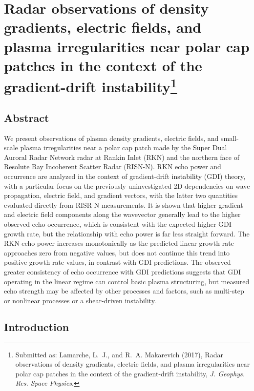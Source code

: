 \chapter[Radar observations of density gradients, electric fields, and plasma irregularities near polar cap patches in the context of the gradient-drift instability]{Radar observations of density gradients, electric fields, and plasma irregularities near polar cap patches in the context of the gradient-drift instability\footnote{Submitted as: {Lamarche}, L.~J., and R.~A. {Makarevich} (2017), Radar observations of density gradients, electric fields, and plasma irregularities near polar cap patches in the context of the gradient-drift instability, \textit{J. Geophys. Res. Space Physics}.}}

\label{sec:paper3}



\section*{Abstract}
We present observations of plasma density gradients, electric fields, and small-scale plasma irregularities near a polar cap patch made by the Super Dual Auroral Radar Network radar at Rankin Inlet (RKN) and the northern face of Resolute Bay Incoherent Scatter Radar (RISN-N). RKN echo power and occurrence are analyzed in the context of gradient-drift instability (GDI) theory, with a particular focus on the previously uninvestigated 2D dependencies on wave propagation, electric field, and gradient vectors, with the latter two quantities evaluated directly from RISR-N measurements. It is shown that higher gradient and electric field components along the wavevector generally lead to the higher observed echo occurrence, which is consistent with the expected higher GDI growth rate, but the relationship with echo power is far less straight forward. The RKN echo power increases monotonically as the predicted linear growth rate approaches zero from negative values, but does not continue this trend into positive growth rate values, in contrast with GDI predictions. The observed greater consistency of echo occurrence with GDI predictions suggests that GDI operating in the linear regime can control basic plasma structuring, but measured echo strength may be affected by other processes and factors, such as multi-step or nonlinear processes or a shear-driven instability.


\section{Introduction}
\label{sec:p3intro}

